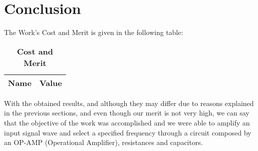 \section{Conclusion}
\label{sec:conclusion}

The Work's Cost and Merit is given in the following table:

\begin{table}[H]
\centering
\begin{tabular}{|l|l|}
\hline
{\bf Name} & {\bf Value} \\ \hline
    
\end{tabular}
\caption{\textbf{Cost and Merit}}
\end{table}

With the obtained results, and although they may differ due to reasons explained in the previous sections, and even though our merit is not very high, we can say that the objective of the work was accomplished and we were able to amplify an input signal wave and select a specified frequency through a circuit composed by an OP-AMP (Operational Amplifier), resistances and capacitors.
